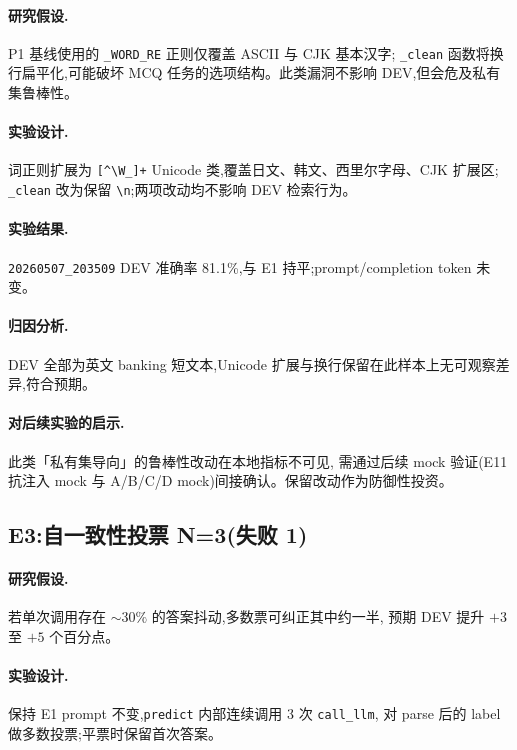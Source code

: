 \documentclass[11pt,a4paper]{ctexart}
\begin{document}
\paragraph{研究假设.}P1 基线使用的 \texttt{\_WORD\_RE} 正则仅覆盖 ASCII 与 CJK 基本汉字;
\texttt{\_clean} 函数将换行扁平化,可能破坏 MCQ 任务的选项结构。此类漏洞不影响 DEV,但会危及私有集鲁棒性。

\paragraph{实验设计.}词正则扩展为 \texttt{[\^{}\textbackslash W\_]+} Unicode 类,覆盖日文、韩文、西里尔字母、CJK 扩展区;
\texttt{\_clean} 改为保留 \verb|\n|;两项改动均不影响 DEV 检索行为。

\paragraph{实验结果.}\texttt{20260507\_203509} DEV 准确率 81.1\%,与 E1 持平;prompt/completion token 未变。

\paragraph{归因分析.}DEV 全部为英文 banking 短文本,Unicode 扩展与换行保留在此样本上无可观察差异,符合预期。

\paragraph{对后续实验的启示.}此类「私有集导向」的鲁棒性改动在本地指标不可见,
需通过后续 mock 验证(E11 抗注入 mock 与 A/B/C/D mock)间接确认。保留改动作为防御性投资。

\subsection{E3:自一致性投票 N=3(失败 1)}

\paragraph{研究假设.}若单次调用存在 $\sim 30\%$ 的答案抖动,多数票可纠正其中约一半,
预期 DEV 提升 $+3$ 至 $+5$ 个百分点。

\paragraph{实验设计.}保持 E1 prompt 不变,\texttt{predict} 内部连续调用 3 次 \texttt{call\_llm},
对 parse 后的 label 做多数投票;平票时保留首次答案。
\end{document}
